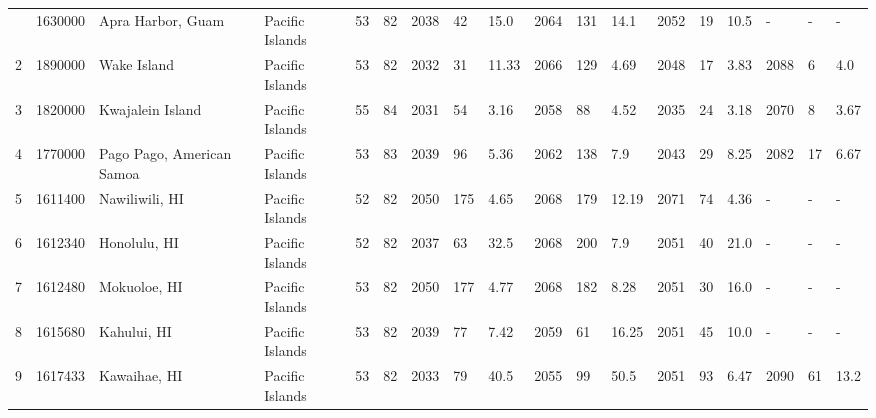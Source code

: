 \begin{longtable}{llllllllllllllllll}
\bottomrule
\endlastfoot
1  &          1630000 &           Apra Harbor, Guam &          Pacific Islands &              53 &       82 &                      2038 &   42 &   15.0 &     2064 &  131 &   14.1 &                          2052 &  19 &  10.5 &        - &    - &     - \\
2  &          1890000 &                 Wake Island &          Pacific Islands &              53 &       82 &                      2032 &   31 &  11.33 &     2066 &  129 &   4.69 &                          2048 &  17 &  3.83 &     2088 &    6 &   4.0 \\
3  &          1820000 &            Kwajalein Island &          Pacific Islands &              55 &       84 &                      2031 &   54 &   3.16 &     2058 &   88 &   4.52 &                          2035 &  24 &  3.18 &     2070 &    8 &  3.67 \\
4  &          1770000 &  Pago Pago, American Samoa  &          Pacific Islands &              53 &       83 &                      2039 &   96 &   5.36 &     2062 &  138 &    7.9 &                          2043 &  29 &  8.25 &     2082 &   17 &  6.67 \\
5  &          1611400 &              Nawiliwili, HI &          Pacific Islands &              52 &       82 &                      2050 &  175 &   4.65 &     2068 &  179 &  12.19 &                          2071 &  74 &  4.36 &        - &    - &     - \\
6  &          1612340 &                Honolulu, HI &          Pacific Islands &              52 &       82 &                      2037 &   63 &   32.5 &     2068 &  200 &    7.9 &                          2051 &  40 &  21.0 &        - &    - &     - \\
7  &          1612480 &                Mokuoloe, HI &          Pacific Islands &              53 &       82 &                      2050 &  177 &   4.77 &     2068 &  182 &   8.28 &                          2051 &  30 &  16.0 &        - &    - &     - \\
8  &          1615680 &                 Kahului, HI &          Pacific Islands &              53 &       82 &                      2039 &   77 &   7.42 &     2059 &   61 &  16.25 &                          2051 &  45 &  10.0 &        - &    - &     - \\
9  &          1617433 &                Kawaihae, HI &          Pacific Islands &              53 &       82 &                      2033 &   79 &   40.5 &     2055 &   99 &   50.5 &                          2051 &  93 &  6.47 &     2090 &   61 &  13.2 \\

\end{longtable}

